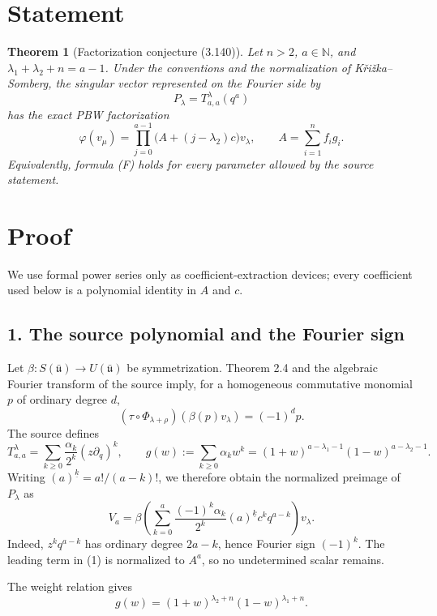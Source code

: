 \documentclass[11pt]{article}
\newtheorem{theorem}{Theorem}
\newcommand{\fall}[2]{(#1)^{\underline{#2}}}
\begin{document}
\section*{Statement}

\begin{theorem}[Factorization conjecture (3.140)]
Let $n>2$, $a\in\mathbb N$, and
$\lambda_1+\lambda_2+n=a-1$.  Under the conventions and the normalization of
K\v{r}i\v{z}ka--Somberg, the singular vector represented on the Fourier side
by
\[
 P_\lambda=T_{a,a}^{\lambda}(q^a)
\]
has the exact PBW factorization
\[
 \varphi(v_\mu)=
 \prod_{j=0}^{a-1}\bigl(A+(j-\lambda_2)c\bigr)v_\lambda,
 \qquad A=\sum_{i=1}^n f_i g_i.
\]
Equivalently, formula \emph{(F)} holds for every parameter allowed by the
source statement.
\end{theorem}

\section*{Proof}

We use formal power series only as coefficient-extraction devices; every
coefficient used below is a polynomial identity in $A$ and $c$.

\subsection*{1. The source polynomial and the Fourier sign}

Let $\beta:S(\bar{\mathfrak u})\to U(\bar{\mathfrak u})$ be symmetrization.
Theorem 2.4 and the algebraic Fourier transform of the source imply, for a
homogeneous commutative monomial $p$ of ordinary degree $d$,
\[
 (\tau\circ\Phi_{\lambda+\rho})(\beta(p)v_\lambda)=(-1)^d p.
\]
The source defines
\[
 T_{a,a}^{\lambda}
 =\sum_{k\ge0}\frac{\alpha_k}{2^k}(z\partial_q)^k,
 \qquad
 g(w):=\sum_{k\ge0}\alpha_k w^k
 =(1+w)^{a-\lambda_1-1}(1-w)^{a-\lambda_2-1}.
\]
Writing $\fall{a}{k}=a!/(a-k)!$, we therefore obtain the normalized preimage
of $P_\lambda$ as
\begin{equation}
 V_a=\beta\left(
   \sum_{k=0}^a\frac{(-1)^k\alpha_k}{2^k}\fall{a}{k}
      c^kq^{a-k}
 \right)v_\lambda.                                                     \tag{1}
\end{equation}
Indeed, $z^kq^{a-k}$ has ordinary degree $2a-k$, hence Fourier sign
$(-1)^k$.  The leading term in (1) is normalized to $A^a$, so no undetermined
scalar remains.

The weight relation gives
\begin{equation}
 g(w)=(1+w)^{\lambda_2+n}(1-w)^{\lambda_1+n}.                           \tag{2}
\end{equation}
\end{document}
